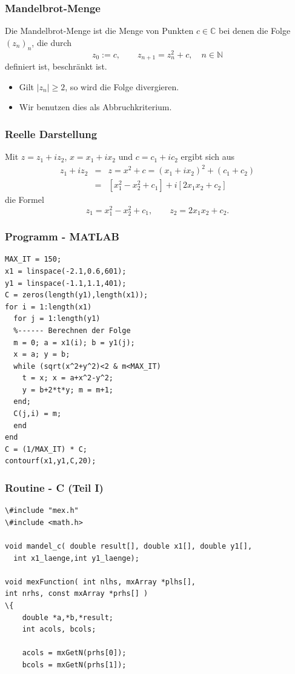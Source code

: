 \begin{frame}[fragile]\frametitle{Mandelbrot-Menge}
Die Mandelbrot-Menge ist die Menge von Punkten $c \in \mathbb{C}$
bei denen die Folge $(z_n)_n$, die durch
\[ z_0:=c, \qquad  z_{n+1} = z_n^2 +c, \quad n \in \mathbb{N}\]
definiert ist, beschr\"ankt ist.
\begin{itemize}
\item Gilt $|z_n| \geq 2$, so wird die Folge divergieren.
\item Wir benutzen dies als Abbruchkriterium.
\end{itemize}
\end{frame}
\begin{frame}[fragile]\frametitle{Reelle Darstellung}
Mit $z=z_1+iz_2$, $x=x_1+ix_2$ und $c=c_1+ic_2$ ergibt sich aus
\begin{eqnarray*}
z_1 + i z_2 & = & z  =  x^2 + c = (x_1+ix_2)^2 + (c_1+c_2) \\
& = & [ x_1^2 -x_2^2 +c_1] + i[2 x_1 x_2 +c_2]
\end{eqnarray*}
die Formel
\[ z_1 = x_1^2 -x_2^2 +c_1, \qquad z_2 = 2 x_1 x_2 + c_2. \]
\end{frame}
\begin{frame}[fragile]\frametitle{Programm - MATLAB}
\begin{lstlisting}
MAX_IT = 150;
x1 = linspace(-2.1,0.6,601);
y1 = linspace(-1.1,1.1,401);
C = zeros(length(y1),length(x1));
for i = 1:length(x1)
  for j = 1:length(y1)
  %------ Berechnen der Folge        
  m = 0; a = x1(i); b = y1(j);
  x = a; y = b;
  while (sqrt(x^2+y^2)<2 & m<MAX_IT)
    t = x; x = a+x^2-y^2;
    y = b+2*t*y; m = m+1;
  end;
  C(j,i) = m;
  end
end
C = (1/MAX_IT) * C;
contourf(x1,y1,C,20);
\end{lstlisting}
\end{frame}
\begin{frame}[fragile]\frametitle{Routine - C (Teil I)}
\begin{lstlisting}
\#include "mex.h"
\#include <math.h>

void mandel_c( double result[], double x1[], double y1[], 
  int x1_laenge,int y1_laenge);

void mexFunction( int nlhs, mxArray *plhs[],
int nrhs, const mxArray *prhs[] )
\{
    double *a,*b,*result;
    int acols, bcols;

    acols = mxGetN(prhs[0]);
    bcols = mxGetN(prhs[1]);
\end{lstlisting}
\end{frame}
